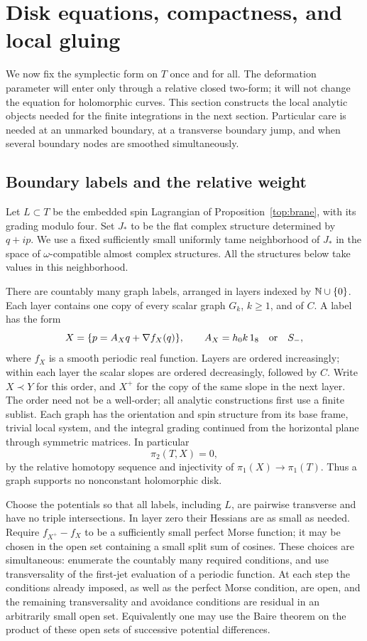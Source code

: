 \section{Disk equations, compactness, and local gluing}
\label{local:section}

We now fix the symplectic form on $T$ once and for all.  The deformation
parameter will enter only through a relative closed two-form; it will not
change the equation for holomorphic curves.  This section constructs the
local analytic objects needed for the finite integrations in the next
section.  Particular care is needed at an unmarked boundary, at a transverse
boundary jump, and when several boundary nodes are smoothed simultaneously.

\subsection{Boundary labels and the relative weight}

Let $L\subset T$ be the embedded spin Lagrangian of
Proposition~\ref{top:brane}, with its
grading modulo four.  Set $J_*$ to be the flat complex structure determined
by $q+ip$.  We use a fixed sufficiently small uniformly tame neighborhood of
$J_*$ in the space of $\omega$-compatible almost complex structures.
All the structures below take values in this neighborhood.

There are countably many graph labels, arranged in layers indexed by
$\mathbb N\cup\{0\}$.  Each layer contains one copy of every scalar graph $G_k$,
$k\geq1$, and of $C$.  A label has the form
\begin{equation}\label{local:graph}
 X=\{p=A_Xq+\nabla f_X(q)\},\qquad
 A_X=h_0k\,1_8\quad\hbox{or}\quad S_-,
\end{equation}
where $f_X$ is a smooth periodic real function.  Layers are ordered
increasingly; within each layer the scalar slopes are ordered decreasingly,
followed by $C$.  Write $X\prec Y$ for this order, and $X^+$ for the copy of
the same slope in the next layer.  The order need not be a well-order; all
analytic constructions first use a finite sublist.  Each graph has the
orientation and spin structure from its base frame, trivial local system,
and the integral grading continued from the horizontal plane through
symmetric matrices.  In particular
\[
 \pi_2(T,X)=0,
\]
by the relative homotopy sequence and injectivity of $\pi_1(X)\to\pi_1(T)$.
Thus a graph supports no nonconstant holomorphic disk.

Choose the potentials so that all labels, including $L$, are pairwise
transverse and have no triple intersections.  In layer zero their Hessians
are as small as needed.  Require $f_{X^+}-f_X$ to be a sufficiently small
perfect Morse function; it may be chosen in the open set containing a small
split sum of cosines.  These choices are simultaneous: enumerate the
countably many required conditions, and use transversality of the
first-jet evaluation of a periodic function.  At each step the conditions
already imposed, as well as the perfect Morse condition, are open, and the
remaining transversality and avoidance conditions are residual in an
arbitrarily small open set.  Equivalently one may use the Baire theorem on
the product of these open sets of successive potential differences.

